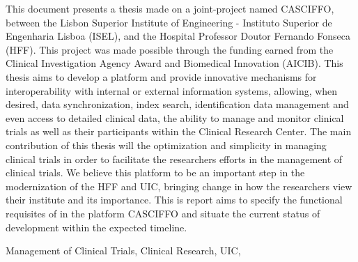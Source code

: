 \abstractEN %
This document presents a thesis made on a joint-project named CASCIFFO, between the Lisbon Superior Institute of Engineering - Instituto Superior de Engenharia Lisboa (ISEL), and the Hospital Professor Doutor Fernando Fonseca (HFF). This project was made possible through the funding earned from the Clinical Investigation Agency Award and Biomedical Innovation (AICIB). 
This thesis aims to develop a platform and provide innovative mechanisms for interoperability with internal or external information systems, allowing, when desired, data synchronization, index search, identification data management and even access to detailed clinical data, the ability to manage and monitor clinical trials as well as their participants within the Clinical Research Center. 
The main contribution of this thesis will the optimization and simplicity in managing clinical trials in order to facilitate the researchers efforts in the management of clinical trials.
We believe this platform to be an important step in the modernization of the HFF and UIC, bringing change in how the researchers view their institute and its importance. 
This is report aims to specify the functional requisites of in the platform CASCIFFO and situate the current status of development within the expected timeline. 








\begin{keywords}
Management of Clinical Trials, Clinical Research, UIC,
\end{keywords} 
